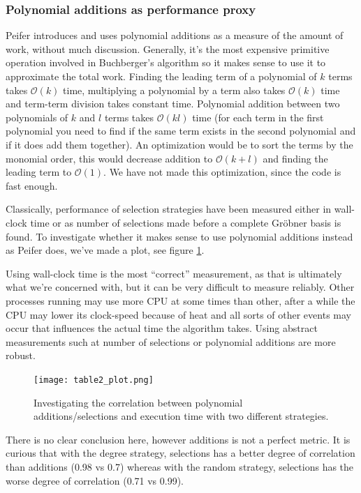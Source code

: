 \documentclass{article}
\theoremstyle{changedot}
\theoremstyle{changedotbreak}
\theoremstyle{nonumberplain}
\begin{document}
\subsubsection{Polynomial additions as performance proxy}
Peifer \cite{peifer} introduces and uses polynomial additions as a measure of the amount of work, without much discussion. Generally, it's the most expensive primitive operation involved in Buchberger's algorithm so it makes sense to use it to approximate the total work. Finding the leading term of a polynomial of $k$ terms takes $\mathcal O(k)$ time, multiplying a polynomial by a term also takes $\mathcal O(k)$ time and term-term division takes constant time. Polynomial addition between two polynomials of $k$ and $l$ terms takes $\mathcal O(kl)$ time (for each term in the first polynomial you need to find if the same term exists in the second polynomial and if it does add them together). An optimization would be to sort the terms by the monomial order, this would decrease addition to $\mathcal O(k+l)$ and finding the leading term to $\mathcal O(1)$. We have not made this optimization, since the code is fast enough.

Classically, performance of selection strategies have been measured either in wall-clock time or as number of selections made before a complete Gröbner basis is found. To investigate whether it makes sense to use polynomial additions instead as Peifer does, we've made a plot, see figure \ref{fig:corr}.

Using wall-clock time is the most ``correct'' measurement, as that is ultimately what we're concerned with, but it can be very difficult to measure reliably. Other processes running may use more CPU at some times than other, after a while the CPU may lower its clock-speed because of heat and all sorts of other events may occur that influences the actual time the algorithm takes. Using abstract measurements such at number of selections or polynomial additions are more robust.

\begin{figure}[h!]
  \centering
  \texttt{[image: table2\_plot.png]}
  \caption{Investigating the correlation between polynomial additions/selections and execution time with two different strategies.}
  \label{fig:corr}
\end{figure}

There is no clear conclusion here, however additions is not a perfect metric. It is curious that with the degree strategy, selections has a better degree of correlation than additions (0.98 vs 0.7) whereas with the random strategy, selections has the worse degree of correlation (0.71 vs 0.99). 
\end{document}
